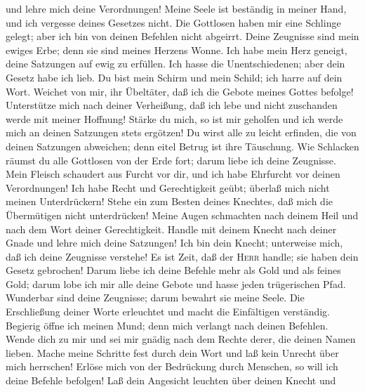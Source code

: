 und lehre mich deine Verordnungen!  Meine Seele ist
beständig in meiner Hand, und ich vergesse deines Gesetzes nicht.
 Die Gottlosen haben mir eine Schlinge gelegt; aber ich
bin von deinen Befehlen nicht abgeirrt.  Deine Zeugnisse
sind mein ewiges Erbe; denn sie sind meines Herzens Wonne.
 Ich habe mein Herz geneigt, deine Satzungen auf ewig zu
erfüllen.  Ich hasse die Unentschiedenen; aber dein
Gesetz habe ich lieb.  Du bist mein Schirm und mein
Schild; ich harre auf dein Wort.  Weichet von mir, ihr
Übeltäter, daß ich die Gebote meines Gottes befolge! 
Unterstütze mich nach deiner Verheißung, daß ich lebe und nicht
zuschanden werde mit meiner Hoffnung!  Stärke du mich,
so ist mir geholfen und ich werde mich an deinen Satzungen stets
ergötzen!  Du wirst alle zu leicht erfinden, die von
deinen Satzungen abweichen; denn eitel Betrug ist ihre Täuschung.
 Wie Schlacken räumst du alle Gottlosen von der Erde
fort; darum liebe ich deine Zeugnisse.  Mein Fleisch
schaudert aus Furcht vor dir, und ich habe Ehrfurcht vor deinen
Verordnungen!  Ich habe Recht und Gerechtigkeit geübt;
überlaß mich nicht meinen Unterdrückern!  Stehe ein zum
Besten deines Knechtes, daß mich die Übermütigen nicht unterdrücken!
 Meine Augen schmachten nach deinem Heil und nach dem
Wort deiner Gerechtigkeit.  Handle mit deinem Knecht
nach deiner Gnade und lehre mich deine Satzungen!  Ich
bin dein Knecht; unterweise mich, daß ich deine Zeugnisse verstehe!
 Es ist Zeit, daß der \textsc{Herr} handle; sie haben
dein Gesetz gebrochen!  Darum liebe ich deine Befehle
mehr als Gold und als feines Gold;  darum lobe ich mir
alle deine Gebote und hasse jeden trügerischen Pfad. 
Wunderbar sind deine Zeugnisse; darum bewahrt sie meine Seele.
 Die Erschließung deiner Worte erleuchtet und macht die
Einfältigen verständig.  Begierig öffne ich meinen Mund;
denn mich verlangt nach deinen Befehlen.  Wende dich zu
mir und sei mir gnädig nach dem Rechte derer, die deinen Namen lieben.
 Mache meine Schritte fest durch dein Wort und laß kein
Unrecht über mich herrschen!  Erlöse mich von der
Bedrückung durch Menschen, so will ich deine Befehle befolgen!
 Laß dein Angesicht leuchten über deinen Knecht und
